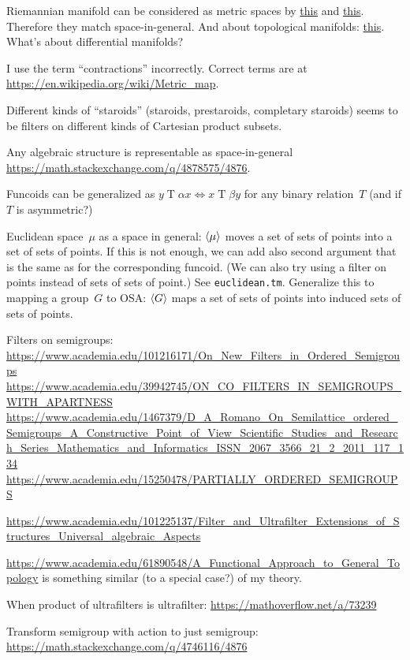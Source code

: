 \documentclass{amsart}
\begin{document}
Riemannian manifold can be considered as metric spaces by
\href{https://mathoverflow.net/q/45154/4086}{this} and \href{https://math.stackexchange.com/q/4962648/4876}{this}.
Therefore they match space-in-general.
And about topological manifolds: \href{https://math.stackexchange.com/q/4963861/4876}{this}.
What's about differential manifolds?

I use the term ``contractions'' incorrectly. Correct terms are at
\url{https://en.wikipedia.org/wiki/Metric_map}.

Different kinds of ``staroids'' (staroids, prestaroids, completary staroids) seems to be filters on
different kinds of Cartesian product subsets.

Any algebraic structure is representable as space-in-general \url{https://math.stackexchange.com/q/4878575/4876}.

Funcoids can be generalized as $y\mathrel{T}\alpha x\Leftrightarrow x\mathrel{T}\beta y$ for any binary relation~$T$
(and if $T$ is asymmetric?)

Euclidean space~$\mu$ as a space in general: $\left\langle \mu\right\rangle$ moves a set of sets of points into a set of sets of points.
If this is not enough, we can add also second argument that is the same as for the corresponding funcoid.
(We can also try using a filter on points instead of sets of sets of point.)
See {\tt euclidean.tm}. Generalize this to mapping a group~$G$ to OSA:
$\left\langle G\right\rangle$ maps a set of sets of points into induced sets of sets of points.

Filters on semigroups:
\url{https://www.academia.edu/101216171/On_New_Filters_in_Ordered_Semigroups}
\url{https://www.academia.edu/39942745/ON_CO_FILTERS_IN_SEMIGROUPS_WITH_APARTNESS}
\url{https://www.academia.edu/1467379/D_A_Romano_On_Semilattice_ordered_Semigroups_A_Constructive_Point_of_View_Scientific_Studies_and_Research_Series_Mathematics_and_Informatics_ISSN_2067_3566_21_2_2011_117_134}
\url{https://www.academia.edu/15250478/PARTIALLY_ORDERED_SEMIGROUPS}


\url{https://www.academia.edu/101225137/Filter_and_Ultrafilter_Extensions_of_Structures_Universal_algebraic_Aspects}

\url{https://www.academia.edu/61890548/A_Functional_Approach_to_General_Topology}
is something similar (to a special case?) of my theory.

When product of ultrafilters is ultrafilter:
\url{https://mathoverflow.net/a/73239}

Transform semigroup with action to just semigroup:
\url{https://math.stackexchange.com/q/4746116/4876}
\end{document}
